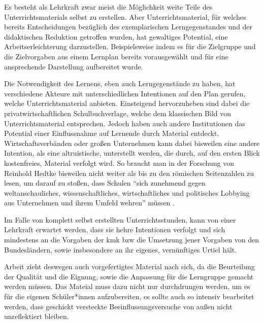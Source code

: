 Es besteht als Lehrkraft zwar meist die Möglichkeit weite Teile des Unterrichtsmaterials selbst zu erstellen.
Aber Unterrichtsmaterial, für welches bereits Entscheidungen bezüglich des exemplarischen Lerngegenstandes und der didaktischen Reduktion getroffen wurden, hat gewaltiges Potential, eine Arbeitserleichterung darzustellen.
Beispielsweise indem es für die Zielgruppe und die Zielvorgaben aus einem Lernplan bereits vorausgewählt und für eine ansprechende Darstellung aufbereitet wurde. 
\bigskip

Die Notwendigkeit des Lernens, eben auch Lerngegenstände zu haben, hat verschiedene Akteure mit unterschiedlichen Intentionen auf den Plan gerufen, welche Unterrichtsmaterial anbieten. 
Einsteigend hervorzuheben sind dabei die privatwirtschaftlichen Schulbuchverlage, welche dem klassischen Bild von Unterrichtsmaterial entsprechen. Jedoch haben auch andere Institutionen das Potential einer Einflussnahme auf Lernende durch 
Material entdeckt. Wirtschaftsverbänden oder großen Unternehmen kann dabei bisweilen eine andere Intention, als eine altruistische, unterstellt werden, die durch, auf den ersten Blick kostenfreies, Material verfolgt wird. So braucht man in der Forschung von Reinhold Hedtke bisweilen nicht weiter als bis zu den römischen Seitenzahlen zu lesen, um darauf zu stoßen, dass Schulen \enquote{sich zunehmend gegen weltanschauliches, wissenschaftliches, wirtschaftliches und politisches Lobbying aus Unternehmen und ihrem Umfeld wehren} müssen \autocite[i]{Hedtke2016}. 

Im Falle von komplett selbst erstellten Unterrichtsstunden, kann von einer Lehrkraft erwartet werden, dass sie hehre Intentionen verfolgt und sich mindestens an die Vorgaben der \gls{kmk} \gls{bzw} die Umsetzung jener Vorgaben von den Bundesländern, sowie insbesondere an ihr eigenes, vernünftiges Urtiel hält. 

Arbeit zieht deswegen auch vorgefertigtes Material nach sich, da die Beurteilung der Qualität und die Eignung, sowie die Anpassung für die Lerngruppe gemacht werden müssen. Das Mateial muss dazu nicht nur durchdrungen werden, um es für die eigenen Schüler*innen aufzubereiten, es sollte auch so intensiv bearbeitet werden, dass geschickt versteckte Beeinflussungsversuche von außen nicht unreflektiert bleiben. 






